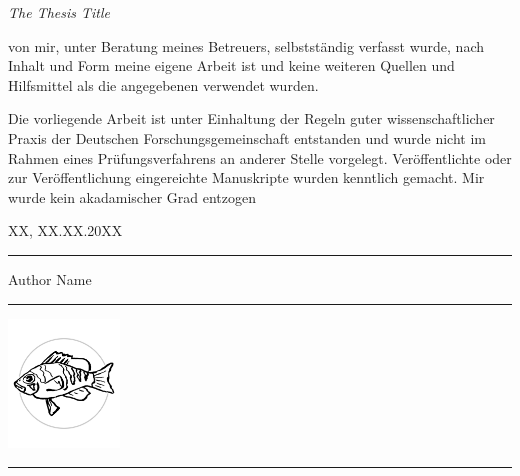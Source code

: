\documentclass[12pt, openany]{book}
\def\MYTITLE{The Thesis Title}
\def\MYAUTHOR{Author Name}
\begin{document}
\textit{\MYTITLE}\vspace{1em}

von mir, unter Beratung meines Betreuers, selbstständig verfasst wurde, nach Inhalt und Form meine eigene Arbeit ist und keine weiteren Quellen und Hilfsmittel als die angegebenen verwendet wurden.

\noindent{}Die vorliegende Arbeit ist unter Einhaltung der Regeln guter wissenschaftlicher Praxis der Deutschen Forschungsgemeinschaft entstanden und wurde nicht im Rahmen eines Prüfungsverfahrens an anderer Stelle vorgelegt.
Veröffentlichte oder zur Veröffentlichung eingereichte Manuskripte wurden kenntlich gemacht.
Mir wurde kein akadamischer Grad entzogen\\\vspace{.07\paperheight}

\noindent{}XX, XX.XX.20XX\hfill{}\rule{.25\textwidth}{0.4pt}

\hfill{}\MYAUTHOR\hspace*{.04\textwidth}\\

\newpage
{}
\thispagestyle{empty}
\textcolor{white!90}{\hrule}\vspace*{1em}
\hfil\includegraphics[width = 8em]{images/logo.pdf}\\
\vfill

\textcolor{white!90}{\hrule}\vspace*{.15em}
\end{document}
